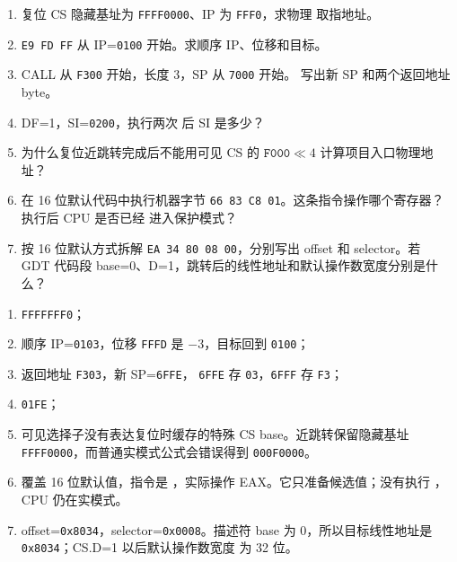 
\begin{enumerate}[leftmargin=2.2em]
  \item 复位 CS 隐藏基址为 \texttt{FFFF0000}、IP 为 \texttt{FFF0}，求物理
    取指地址。
  \item \texttt{E9 FD FF} 从 IP=\texttt{0100} 开始。求顺序 IP、位移和目标。
  \item CALL 从 \texttt{F300} 开始，长度 3，SP 从 \texttt{7000} 开始。
    写出新 SP 和两个返回地址 byte。
  \item DF=1，SI=\texttt{0200}，执行两次  后 SI 是多少？
  \item 为什么复位近跳转完成后不能用可见 CS 的
    \(\texttt{F000}\ll4\) 计算项目入口物理地址？
  \item 在 16 位默认代码中执行机器字节
    \texttt{66 83 C8 01}。这条指令操作哪个寄存器？执行后 CPU 是否已经
    进入保护模式？
  \item 按 16 位默认方式拆解
    \texttt{EA 34 80 08 00}，分别写出 offset 和 selector。若 GDT 代码段
    base=0、D=1，跳转后的线性地址和默认操作数宽度分别是什么？
\end{enumerate}

\begin{answerbox}
\begin{enumerate}[leftmargin=2.2em]
  \item \texttt{FFFFFFF0}；
  \item 顺序 IP=\texttt{0103}，位移 \texttt{FFFD} 是 \(-3\)，目标回到
    \texttt{0100}；
  \item 返回地址 \texttt{F303}，新 SP=\texttt{6FFE}，
    \texttt{6FFE} 存 \texttt{03}，\texttt{6FFF} 存 \texttt{F3}；
  \item \texttt{01FE}；
  \item 可见选择子没有表达复位时缓存的特殊 CS base。近跳转保留隐藏基址
    \texttt{FFFF0000}，而普通实模式公式会错误得到 \texttt{000F0000}。
  \item {} 覆盖 16 位默认值，指令是 ，实际操作
    EAX。它只准备候选值；没有执行 ，CPU 仍在实模式。
  \item offset=\texttt{0x8034}，selector=\texttt{0x0008}。描述符 base
    为 0，所以目标线性地址是 \texttt{0x8034}；CS.D=1 以后默认操作数宽度
    为 32 位。
\end{enumerate}
\end{answerbox}
